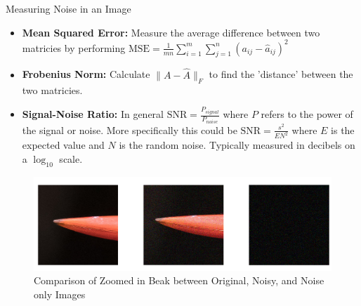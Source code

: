 \documentclass[aspectratio=169,xcolor=dvipsnames]{beamer}
\begin{document}
	
	\begin{frame}{Measuring Noise in an Image}
		\begin{itemize}
			\item \textbf{Mean Squared Error:} Measure the average difference between two matricies by performing $\text{MSE} = \frac{1}{mn}\sum_{i=1}^m\sum_{j=1}^{n}(a_{ij}-\hat{a}_{ij})^2$
			\item \textbf{Frobenius Norm:} Calculate $\|A-\hat{A}\|_F$ to find the 'distance' between the two matricies\cite{Shabalin2013}.  
			\item \textbf{Signal-Noise Ratio:} In general $\text{SNR} = \frac{P_{signal}}{P_{noise}}$ where $P$ refers to the power of the signal or noise. More specifically this could be $\text{SNR} = \frac{s^2}{EN^2}$ where $E$ is the expected value and $N$ is the random noise. Typically measured in decibels on a $\log_{10}$ scale. 
		\end{itemize}
	\begin{figure}
		\centering
		\includegraphics[scale=0.3]{BeakNoise.png}
		\caption{Comparison of Zoomed in Beak between Original, Noisy, and Noise only Images}
	\end{figure}
	\end{frame}
	
	
\end{document}
